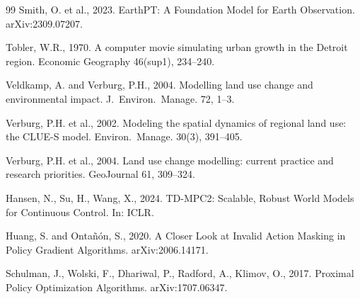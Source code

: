 \documentclass{article}
\begin{document}
\begin{thebibliography}{99}
Smith, O. et al., 2023. EarthPT: A Foundation Model for Earth Observation. arXiv:2309.07207.

Tobler, W.R., 1970. A computer movie simulating urban growth in the Detroit region. Economic Geography 46(sup1), 234--240.

Veldkamp, A. and Verburg, P.H., 2004. Modelling land use change and environmental impact. J.~Environ.~Manage. 72, 1--3.

Verburg, P.H. et al., 2002. Modeling the spatial dynamics of regional land use: the CLUE-S model. Environ.~Manage. 30(3), 391--405.

Verburg, P.H. et al., 2004. Land use change modelling: current practice and research priorities. GeoJournal 61, 309--324.

Hansen, N., Su, H., Wang, X., 2024. TD-MPC2: Scalable, Robust World Models for Continuous Control. In: ICLR.

Huang, S. and Onta\~{n}\'{o}n, S., 2020. A Closer Look at Invalid Action Masking in Policy Gradient Algorithms. arXiv:2006.14171.

Schulman, J., Wolski, F., Dhariwal, P., Radford, A., Klimov, O., 2017. Proximal Policy Optimization Algorithms. arXiv:1707.06347.

\end{thebibliography}
\end{document}
